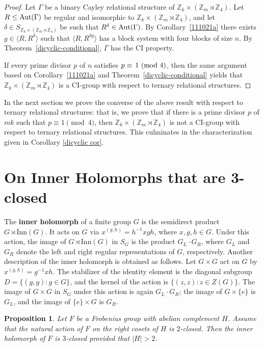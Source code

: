 \documentclass[11pt]{amsart}
\numberwithin{equation}{section}
\newtheorem{prop}[thrm]{Proposition}
\theoremstyle{definition}
\def\Aut{{\rm Aut}}
\def\Z{{\mathbb Z}}
\newcommand{\sg}[1]{\langle{#1}\rangle}
\newcommand{\inn}{\mathrm{Inn}}
\begin{document}
	\begin{proof}
		Let $\Gamma$ be a binary Cayley relational structure of $\Z_k\times(\Z_m\rtimes\Z_4)$. Let $R\le\Aut(\Gamma)$ be regular and isomorphic to $\Z_k\times(\Z_m\rtimes\Z_4)$, and let $\delta\in S_{\Z_k\times(\Z_m\rtimes\Z_4)}$ be such that $R^\delta\in{\rm Aut}(\Gamma)$. By Corollary~\ref{111021a} there exists $g\in\sg{R,R^\delta}$ such that $\sg{R,R^{\delta g}}$ has a block system with four blocks of size $n$. By Theorem~\ref{dicyclic-conditional}, $\Gamma$ has the CI property.
		
		If every prime divisor $p$ of $n$ satisfies $p\equiv\,1 \ ({\rm mod}\ 4)$, then the same argument based on Corollary~\ref{111021a} and Theorem~\ref{dicyclic-conditional} yields that $\Z_k\times(\Z_m\rtimes\Z_4)$ is a CI-group with respect to ternary relational structures.
	\end{proof}
	
	In the next section  we prove the converse of the above result with respect to ternary relational structures: that is, we prove that if there is a prime divisor $p$ of $mk$ such that $p \equiv 1 \pmod{4}$, then $\Z_k \times (\Z_m \rtimes \Z_4)$ is not a CI-group with respect to ternary relational structures. This culminates in the characterization given in Corollary \ref{dicyclic cor}. 
	\section{On Inner Holomorphs that are 3-closed}\label{sec:holomorph}
	
	The \textbf{inner holomorph} of a finite group $G$ is the semidirect product $G \rtimes \inn(G)$.  
	It acts on $G$ via
	$x^{(g,h)} = h^{-1} x g h$, where $x,g,h \in G$.
	Under this action, the image of $G \rtimes \inn(G)$ in $S_G$ is the product $G_L \cdot G_R$, where  
	$G_L$ and $G_R$ denote the left and right regular representations of $G$, respectively.
	Another description of the inner holomorph is obtained as follows.  
	Let $G \times G$ act on $G$ by 
	$x^{(g,h)} = g^{-1} x h$.
	The stabilizer of the identity element is the diagonal subgroup $
	D = \{(g,g) : g \in G\}$,
	and the kernel of the action is 
	$\{(z,z) : z \in Z(G)\}.$
	The image of $G \times G$ in $S_G$ under this action is again $G_L \cdot G_R$;  
	the image of $G \times \{e\}$ is $G_L$, and the image of $\{e\} \times G$ is $G_R$.
	
	
	\begin{prop}\label{3closed} Let $F$ be a Frobenius group with abelian complement $H$. Assume that the natural action of $F$ on the right cosets of $H$ is $2$-closed. Then the inner holomorph of $F$ is $3$-closed provided that $|H|>2$.
	\end{prop}
	
\end{document}

